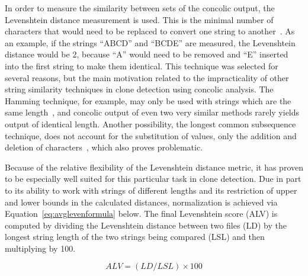\documentclass[smallextended]{svjour3}       %
\begin{document}
In order to measure the similarity between sets of the concolic output, the Levenshtein distance measurement is used. This is the minimal number of characters that would need to be replaced to convert one string to another~\cite{Bard:2007:STO:1274531.1274545,Greenhill:2011:LDF:2077692.2077695}. As an example, if the strings ``ABCD'' and ``BCDE'' are measured, the Levenshtein distance would be 2, because ``A'' would need to be removed and ``E'' inserted into the first string to make them identical. This technique was selected for several reasons, but the main motivation related to the impracticality of other string similarity techniques in clone detection using concolic analysis. The Hamming technique, for example, may only be used with strings which are the same length~\cite{Ros:2005:PRR:1086297.1086311, Jain:2012:HES:2324796.2324820}, and concolic output of even two very similar methods rarely yields output of identical length. Another possibility, the longest common subsequence technique, does not account for the substitution of values, only the addition and deletion of characters~\cite{Li:2008:SEA:1593105.1593164}, which also proves problematic.

Because of the relative flexibility of the Levenshtein distance metric, it has proven to be especially well suited for this particular task in clone detection. Due in part to its ability to work with strings of different lengths and its restriction of upper and lower bounds in the calculated distances, normalization is achieved via Equation~\ref{eq:avglevenformula} below. The final Levenshtein score (ALV) is computed by dividing the Levenshtein distance between two files (LD) by the longest string length of the two strings being compared (LSL) and then multiplying by 100.

\begin{equation} \label{eq:avglevenformula}
ALV = (LD/LSL) \times 100
\end{equation}



\end{document}
